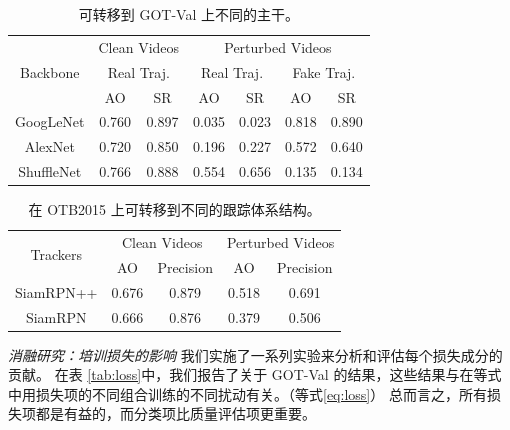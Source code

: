 \begin{table}
\centering
\begin{tabular}{c|cc|cc|cc} 
\toprule
\multirow{3}{*}[-6pt]{Backbone} & \multicolumn{2}{c|}{Clean Videos}    & \multicolumn{4}{c}{Perturbed Videos}                                        \\ 
\cmidrule{2-7}
                          & \multicolumn{2}{c|}{Real Traj.} & \multicolumn{2}{c|}{Real Traj.} & \multicolumn{2}{c}{Fake Traj.}  \\ 
\cmidrule{2-7}
                          & AO    & SR                           & AO    & SR                           & AO    & SR                           \\ 
\midrule
GoogLeNet                 & 0.760 & 0.897                        & 0.035 & 0.023                        & 0.818 & 0.890                        \\
AlexNet                   & 0.720 & 0.850                        & 0.196 & 0.227                        & 0.572 & 0.640                        \\
ShuffleNet                & 0.766 & 0.888                        & 0.554 & 0.656                        & 0.135 & 0.134                        \\
\bottomrule
\end{tabular}
\caption{可转移到 GOT-Val 上不同的主干。}
\label{tab:backbone}
\end{table}

\begin{table}
\centering
\begin{tabular}{c|cc|cc} 
\toprule
\multirow{2}{*}[-2pt]{Trackers} & \multicolumn{2}{c|}{Clean Videos} & \multicolumn{2}{c}{Perturbed Videos}  \\
\cmidrule{2-5}
                          & AO & Precision              & AO & Precision                   \\
\midrule
SiamRPN++                 & 0.676   & 0.879                  & 0.518   & 0.691                       \\
SiamRPN                   & 0.666   & 0.876                  & 0.379   & 0.506                       \\
\bottomrule
\end{tabular}
\caption{在 OTB2015 上可转移到不同的跟踪体系结构。}
\label{tab:arch}
\end{table}

\textit{消融研究：培训损失的影响} 我们实施了一系列实验来分析和评估每个损失成分的贡献。
在表 \ref{tab:loss}中，我们报告了关于 GOT-Val 的结果，这些结果与在等式中用损失项的不同组合训练的不同扰动有关。（等式\ref{eq:loss}）
总而言之，所有损失项都是有益的，而分类项比质量评估项更重要。

